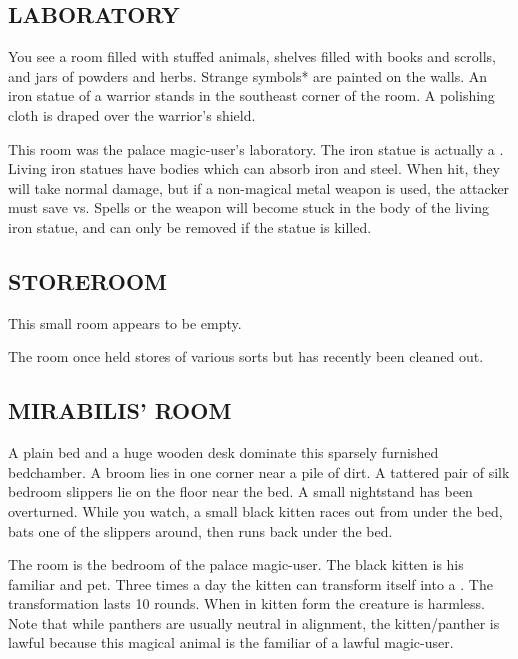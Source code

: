 \documentclass[letterpaper,serif,tightsqueeze]{module}
\begin{document}
\subsection{LABORATORY}
\begin{boxtext}
You see a room filled with stuffed animals, shelves filled with
books and scrolls, and jars of powders and herbs. Strange
symbols* are painted on the walls. An iron statue of a warrior
stands in the southeast corner of the room. A polishing cloth is
draped over the warrior's shield.
\end{boxtext}
This room was the palace magic-user's laboratory. The iron statue
is actually a .
Living iron statues have bodies which can absorb iron and steel. When hit, they will take normal
damage, but if a non-magical metal weapon is used, the attacker
must save vs. Spells or the weapon will become stuck in the body of
the living iron statue, and can only be removed if the statue is killed.
\subsection{STOREROOM}
\begin{boxtext}
This small room appears to be empty.
\end{boxtext}
The room once held stores of various sorts but has recently been
cleaned out.
\subsection{MIRABILIS' ROOM}
\begin{boxtext}
A plain bed and a huge wooden desk dominate this sparsely
furnished bedchamber. A broom lies in one corner near a pile of
dirt. A tattered pair of silk bedroom slippers lie on the floor near
the bed. A small nightstand has been overturned. While you
watch, a small black kitten races out from under the bed, bats
one of the slippers around, then runs back under the bed.
\end{boxtext}
The room is the bedroom of the palace magic-user. The black
kitten is his familiar and pet. Three times a day the kitten can
transform itself into a .
The transformation lasts 10 rounds. When in kitten form the creature is harmless. Note that
while panthers are usually neutral in alignment, the kitten/panther is lawful because this magical animal is the familiar of a
lawful magic-user.
\end{document}
